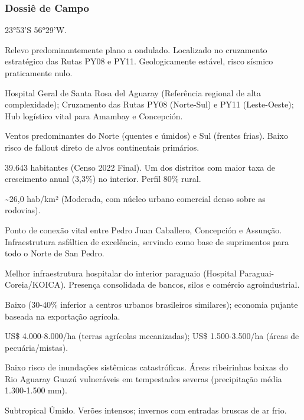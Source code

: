 \subsubsection{Dossiê de Campo}
\begin{description}[style=nextline,leftmargin=0.5cm,font=\bfseries]
\item[Coordenadas]  23°53'S 56°29'W.
\item[Topografia]  Relevo predominantemente plano a ondulado. Localizado no cruzamento estratégico das Rutas PY08 e PY11. Geologicamente estável, risco sísmico praticamente nulo.
\item[Alvos Estratégicos]  Hospital Geral de Santa Rosa del Aguaray (Referência regional de alta complexidade); Cruzamento das Rutas PY08 (Norte-Sul) e PY11 (Leste-Oeste); Hub logístico vital para Amambay e Concepción.
\item[Fallout]  Ventos predominantes do Norte (quentes e úmidos) e Sul (frentes frias). Baixo risco de fallout direto de alvos continentais primários.
\item[População]  39.643 habitantes (Censo 2022 Final). Um dos distritos com maior taxa de crescimento anual (3,3\%) no interior. Perfil 80\% rural.
\item[Densidade]  \textasciitilde 26,0 hab/\allowbreak km² (Moderada, com núcleo urbano comercial denso sobre as rodovias).
\item[Vias de Acesso]  Ponto de conexão vital entre Pedro Juan Caballero, Concepción e Assunção. Infraestrutura asfáltica de excelência, servindo como base de suprimentos para todo o Norte de San Pedro.
\item[Serviços]  Melhor infraestrutura hospitalar do interior paraguaio (Hospital Paraguai-Coreia/\allowbreak KOICA). Presença consolidada de bancos, silos e comércio agroindustrial.
\item[Custo de Vida]  Baixo (30-40\% inferior a centros urbanos brasileiros similares); economia pujante baseada na exportação agrícola.
\item[Preço da Terra]  US\$ 4.000-8.000/\allowbreak ha (terras agrícolas mecanizadas); US\$ 1.500-3.500/\allowbreak ha (áreas de pecuária/\allowbreak mistas).
\item[Hidrologia]  Baixo risco de inundações sistêmicas catastróficas. Áreas ribeirinhas baixas do Rio Aguaray Guazú vulneráveis em tempestades severas (precipitação média 1.300-1.500 mm).
\item[Clima]  Subtropical Úmido. Verões intensos; invernos com entradas bruscas de ar frio.

\end{description}
